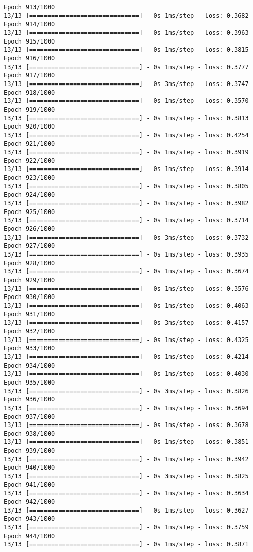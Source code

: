 \documentclass[11pt]{article}
\begin{document}
\begin{Verbatim}[commandchars=\\\{\}]
Epoch 913/1000
13/13 [==============================] - 0s 1ms/step - loss: 0.3682
Epoch 914/1000
13/13 [==============================] - 0s 1ms/step - loss: 0.3963
Epoch 915/1000
13/13 [==============================] - 0s 1ms/step - loss: 0.3815
Epoch 916/1000
13/13 [==============================] - 0s 1ms/step - loss: 0.3777
Epoch 917/1000
13/13 [==============================] - 0s 3ms/step - loss: 0.3747
Epoch 918/1000
13/13 [==============================] - 0s 1ms/step - loss: 0.3570
Epoch 919/1000
13/13 [==============================] - 0s 1ms/step - loss: 0.3813
Epoch 920/1000
13/13 [==============================] - 0s 1ms/step - loss: 0.4254
Epoch 921/1000
13/13 [==============================] - 0s 1ms/step - loss: 0.3919
Epoch 922/1000
13/13 [==============================] - 0s 1ms/step - loss: 0.3914
Epoch 923/1000
13/13 [==============================] - 0s 1ms/step - loss: 0.3805
Epoch 924/1000
13/13 [==============================] - 0s 1ms/step - loss: 0.3982
Epoch 925/1000
13/13 [==============================] - 0s 1ms/step - loss: 0.3714
Epoch 926/1000
13/13 [==============================] - 0s 3ms/step - loss: 0.3732
Epoch 927/1000
13/13 [==============================] - 0s 1ms/step - loss: 0.3935
Epoch 928/1000
13/13 [==============================] - 0s 1ms/step - loss: 0.3674
Epoch 929/1000
13/13 [==============================] - 0s 1ms/step - loss: 0.3576
Epoch 930/1000
13/13 [==============================] - 0s 1ms/step - loss: 0.4063
Epoch 931/1000
13/13 [==============================] - 0s 3ms/step - loss: 0.4157
Epoch 932/1000
13/13 [==============================] - 0s 1ms/step - loss: 0.4325
Epoch 933/1000
13/13 [==============================] - 0s 1ms/step - loss: 0.4214
Epoch 934/1000
13/13 [==============================] - 0s 1ms/step - loss: 0.4030
Epoch 935/1000
13/13 [==============================] - 0s 3ms/step - loss: 0.3826
Epoch 936/1000
13/13 [==============================] - 0s 1ms/step - loss: 0.3694
Epoch 937/1000
13/13 [==============================] - 0s 1ms/step - loss: 0.3678
Epoch 938/1000
13/13 [==============================] - 0s 1ms/step - loss: 0.3851
Epoch 939/1000
13/13 [==============================] - 0s 1ms/step - loss: 0.3942
Epoch 940/1000
13/13 [==============================] - 0s 3ms/step - loss: 0.3825
Epoch 941/1000
13/13 [==============================] - 0s 1ms/step - loss: 0.3634
Epoch 942/1000
13/13 [==============================] - 0s 1ms/step - loss: 0.3627
Epoch 943/1000
13/13 [==============================] - 0s 1ms/step - loss: 0.3759
Epoch 944/1000
13/13 [==============================] - 0s 1ms/step - loss: 0.3871

\end{Verbatim}
\end{document}

